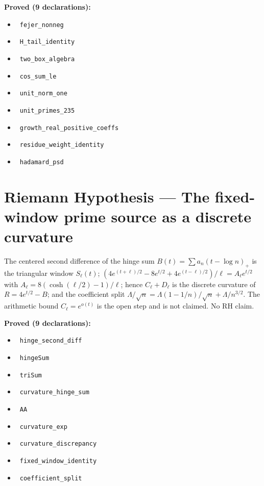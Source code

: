 \documentclass{report}
\theoremstyle{definition}
\begin{document}
\noindent\textbf{Proved (9 declarations):}
\begin{itemize}
  \item {}\leanok\ \texttt{fejer\_nonneg}
  \item {}\leanok\ \texttt{H\_tail\_identity}
  \item {}\leanok\ \texttt{two\_box\_algebra}
  \item {}\leanok\ \texttt{cos\_sum\_le}
  \item {}\leanok\ \texttt{unit\_norm\_one}
  \item {}\leanok\ \texttt{unit\_primes\_235}
  \item {}\leanok\ \texttt{growth\_real\_positive\_coeffs}
  \item {}\leanok\ \texttt{residue\_weight\_identity}
  \item {}\leanok\ \texttt{hadamard\_psd}
\end{itemize}

\section{Riemann Hypothesis --- The fixed-window prime source as a discrete curvature}
The centered second difference of the hinge sum $B(t)=\sum a_n(t-\log n)_+$ is the triangular window $S_\ell(t)$; $(4e^{(t+\ell)/2}-8e^{t/2}+4e^{(t-\ell)/2})/\ell=A_\ell e^{t/2}$ with $A_\ell=8(\cosh(\ell/2)-1)/\ell$; hence $C_\ell+D_\ell$ is the discrete curvature of $R=4e^{t/2}-B$; and the coefficient split $\Lambda/\sqrt n=\Lambda(1-1/n)/\sqrt n+\Lambda/n^{3/2}$. The arithmetic bound $C_\ell=e^{o(t)}$ is the open step and is not claimed. No RH claim.

\noindent\textbf{Proved (9 declarations):}
\begin{itemize}
  \item {}\leanok\ \texttt{hinge\_second\_diff}
  \item {}\leanok\ \texttt{hingeSum}
  \item {}\leanok\ \texttt{triSum}
  \item {}\leanok\ \texttt{curvature\_hinge\_sum}
  \item {}\leanok\ \texttt{AA}
  \item {}\leanok\ \texttt{curvature\_exp}
  \item {}\leanok\ \texttt{curvature\_discrepancy}
  \item {}\leanok\ \texttt{fixed\_window\_identity}
  \item {}\leanok\ \texttt{coefficient\_split}
\end{itemize}
\end{document}
